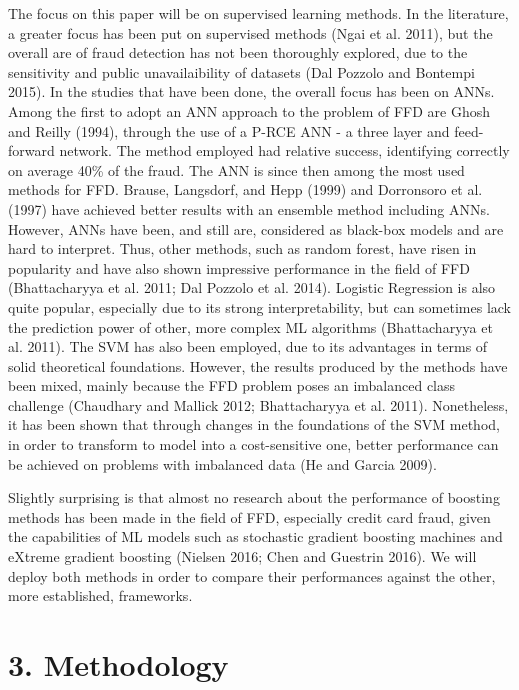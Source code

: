 \documentclass[12pt,]{article}
\begin{document}
The focus on this paper will be on supervised learning methods. In the
literature, a greater focus has been put on supervised methods (Ngai et
al. 2011), but the overall are of fraud detection has not been
thoroughly explored, due to the sensitivity and public unavailaibility
of datasets (Dal Pozzolo and Bontempi 2015). In the studies that have
been done, the overall focus has been on ANNs. Among the first to adopt
an ANN approach to the problem of FFD are Ghosh and Reilly (1994),
through the use of a P-RCE ANN - a three layer and feed-forward network.
The method employed had relative success, identifying correctly on
average 40\% of the fraud. The ANN is since then among the most used
methods for FFD. Brause, Langsdorf, and Hepp (1999) and Dorronsoro et
al. (1997) have achieved better results with an ensemble method
including ANNs. However, ANNs have been, and still are, considered as
black-box models and are hard to interpret. Thus, other methods, such as
random forest, have risen in popularity and have also shown impressive
performance in the field of FFD (Bhattacharyya et al. 2011; Dal Pozzolo
et al. 2014). Logistic Regression is also quite popular, especially due
to its strong interpretability, but can sometimes lack the prediction
power of other, more complex ML algorithms (Bhattacharyya et al. 2011).
The SVM has also been employed, due to its advantages in terms of solid
theoretical foundations. However, the results produced by the methods
have been mixed, mainly because the FFD problem poses an imbalanced
class challenge (Chaudhary and Mallick 2012; Bhattacharyya et al. 2011).
Nonetheless, it has been shown that through changes in the foundations
of the SVM method, in order to transform to model into a cost-sensitive
one, better performance can be achieved on problems with imbalanced data
(He and Garcia 2009).

Slightly surprising is that almost no research about the performance of
boosting methods has been made in the field of FFD, especially credit
card fraud, given the capabilities of ML models such as stochastic
gradient boosting machines and eXtreme gradient boosting (Nielsen 2016;
Chen and Guestrin 2016). We will deploy both methods in order to compare
their performances against the other, more established, frameworks.

\hypertarget{methodology}{%
\section{3. Methodology}\label{methodology}}
\end{document}
